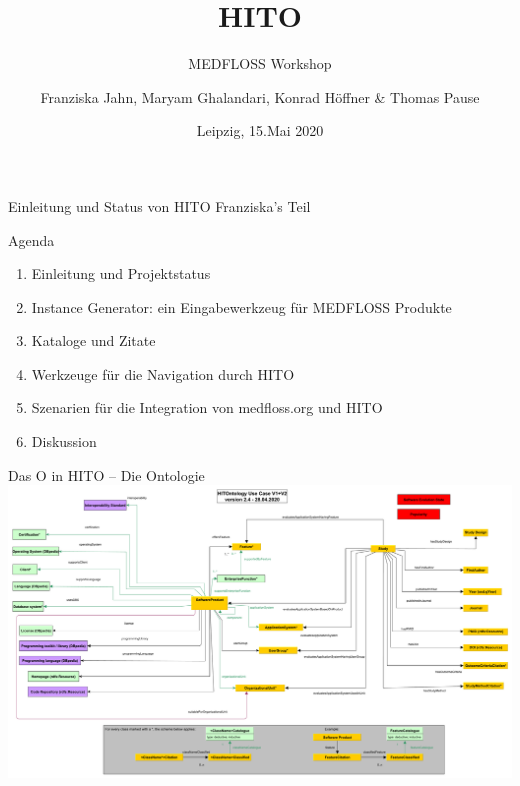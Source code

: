 \documentclass[aspectratio=1610,12pt]{beamer}
\author{Franziska Jahn, Maryam Ghalandari, Konrad Höffner \& Thomas Pause}
\date{Leipzig, 15.Mai 2020}
\title{HITO}
\subtitle{MEDFLOSS Workshop}
\begin{document}
\begin{frame}
\titlepage
\end{frame}

\begin{frame}{Einleitung und Status von HITO}
  \centering
  \huge Franziska's Teil
\end{frame}

\begin{frame}{Agenda}
\begin{spacing}{1.25}
\begin{enumerate}
\item Einleitung und Projektstatus
\item Instance Generator: ein Eingabewerkzeug für MEDFLOSS Produkte
\item Kataloge und Zitate
\item Werkzeuge für die Navigation durch HITO
\item Szenarien für die Integration von medfloss.org und HITO
\item Diskussion
\end{enumerate}
\end{spacing}
\end{frame}

\begin{frame}{Das O in HITO -- Die Ontologie}
\centering
\includegraphics[width=.95\textwidth]{img/HITontology.pdf}
\end{frame}
\end{document}
